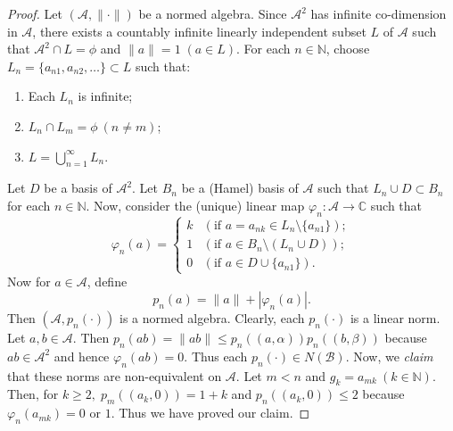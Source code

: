 \documentclass[10pt,a4paper]{amsart}
\begin{document}
 \begin{proof} Let $(\mathcal{A}, \| \cdot \|)$ be a normed algebra. Since $\mathcal{A}^2$ has infinite co-dimension in $\mathcal{A}$, there exists a countably infinite linearly independent subset $L$ of $\mathcal{A}$ such that $\mathcal{A}^2 \cap L = \phi$ and $\| a \| =1 \; (a \in L)$. For each $n \in \mathbb{N}$, choose $L_n = \{ a_{n1}, a_{n2}, \ldots \} \subset L$ such that: 
 	\begin{enumerate}
 		\item Each $L_n$ is infinite;
 		\item $L_n \cap L_m = \phi \ (n \neq m)$;
 		\item  $L = \bigcup_{n=1}^{ \infty} L_n$.
 	\end{enumerate}
 	Let $D$ be a basis of $\mathcal{A}^2$. Let $B_n$ be a (Hamel) basis of $\mathcal{A}$ such that $L_n \cup D \subset B_n$ for each $n \in \mathbb{N}$. Now, consider the (unique) linear map $\varphi_n : \mathcal{A} \longrightarrow \mathbb{C}$ such that
 	\[
 	\varphi_n(a)=
 	\begin{cases}
 		k&  (\text{if } a=a_{nk}  \in L_n \setminus \{a_{n1}\});\\
 		1 & (\text{if } a \in B_n \setminus (L_n \cup D)); \\
 		0 & (\text{if } a \in D \cup \{a_{n1}\}).
 	\end{cases}
 	\]
 	Now for $a \in \mathcal{A}$, define
 	$$p_n(a)=\|a\|+ |\varphi_n(a)|.$$
 	Then $(\mathcal{A}, p_n( \cdot ))$ is a normed algebra.
 	Clearly, each $p_n(\cdot)$ is a linear norm. Let $a, b \in \mathcal{A}$. Then $p_n(ab)  = \|ab\| \leq p_n((a, \alpha))p_n((b, \beta))$ because $ab \in \mathcal{A}^2$ and hence $\varphi_n(ab) = 0$. Thus each $p_n(\cdot) \in N(\mathcal{B})$. Now, we \textit{claim} that these norms are non-equivalent on $\mathcal{A}$. Let $m < n$ and $g_k = a_{mk} \ (k \in \mathbb{N})$. Then, for $k \geq 2, \; p_m((a_k, 0)) = 1+k$ and $p_n((a_k, 0)) \leq 2$ because $\varphi_n(a_{mk}) = 0 \text{ or 1}$. Thus we have proved our claim.
 \end{proof}
\end{document}
